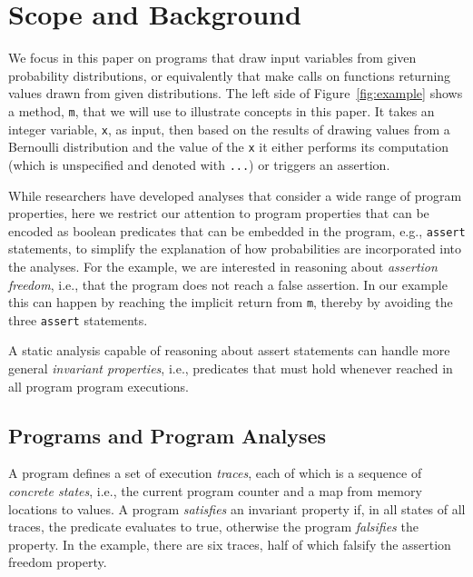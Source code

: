 \section{Scope and Background}
\label{sec:background}



We focus in this paper on programs that draw input variables
from given probability distributions, or equivalently that make
calls on functions returning values drawn from given distributions.
The left side of Figure~\ref{fig:example} shows a method,
\texttt{m}, that we will use to illustrate concepts in this paper.     
It takes an integer variable, \texttt{x}, as input, then based on the 
results of drawing values from a Bernoulli distribution
and the value of the \texttt{x} it either performs its computation
(which is unspecified and denoted with \texttt{...}) or triggers
an assertion. 

While researchers have developed analyses that consider a wide
range of program properties, here
we restrict our attention to program
properties that can be encoded as boolean predicates that
can be embedded in the program,
e.g., \texttt{assert} statements, to simplify the explanation
of how probabilities are incorporated into the analyses.
For the example, we are interested in reasoning about
\textit{assertion freedom}, i.e., that the program does
not reach a false assertion.
In our example
this can happen by reaching the implicit return from \texttt{m},
thereby by avoiding the three \texttt{assert} statements.

A static analysis capable of reasoning about assert statements 
can handle more general \textit{invariant properties}, i.e., 
predicates that must hold whenever reached in all program program executions.  

\subsection{Programs and Program Analyses}
A program defines a set of execution \textit{traces}, each of
which is a sequence of \textit{concrete states}, i.e., 
the current program counter and a map from memory locations to values.
A program \textit{satisfies} an invariant property if, in all states of 
all traces, the predicate evaluates to true, otherwise the program
\textit{falsifies} the property.
In the example, there are six traces, half of which falsify the assertion
freedom property.

